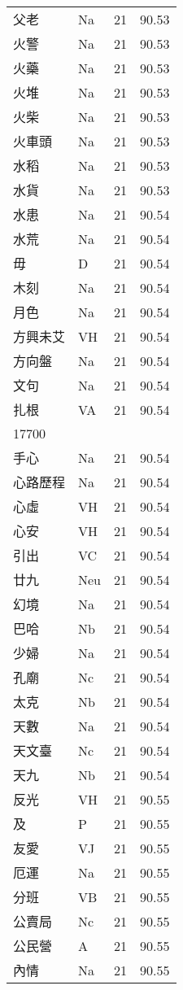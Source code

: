 \documentclass[twocolumn]{book}
\begin{document}
\begin{supertabular}{llrr}
父老 & Na & 21 &  90.53\\
火警 & Na & 21 &  90.53\\
火藥 & Na & 21 &  90.53\\
火堆 & Na & 21 &  90.53\\
火柴 & Na & 21 &  90.53\\
火車頭 & Na & 21 &  90.53\\
水稻 & Na & 21 &  90.53\\
水貨 & Na & 21 &  90.53\\
水患 & Na & 21 &  90.54\\
水荒 & Na & 21 &  90.54\\
毋 & D & 21 &  90.54\\
木刻 & Na & 21 &  90.54\\
月色 & Na & 21 &  90.54\\
方興未艾 & VH & 21 &  90.54\\
方向盤 & Na & 21 &  90.54\\
文句 & Na & 21 &  90.54\\
扎根 & VA & 21 &  90.54\\
17700\\
手心 & Na & 21 &  90.54\\
心路歷程 & Na & 21 &  90.54\\
心虛 & VH & 21 &  90.54\\
心安 & VH & 21 &  90.54\\
引出 & VC & 21 &  90.54\\
廿九 & Neu & 21 &  90.54\\
幻境 & Na & 21 &  90.54\\
巴哈 & Nb & 21 &  90.54\\
少婦 & Na & 21 &  90.54\\
孔廟 & Nc & 21 &  90.54\\
太克 & Nb & 21 &  90.54\\
天數 & Na & 21 &  90.54\\
天文臺 & Nc & 21 &  90.54\\
天九 & Nb & 21 &  90.54\\
反光 & VH & 21 &  90.55\\
及 & P & 21 &  90.55\\
友愛 & VJ & 21 &  90.55\\
厄運 & Na & 21 &  90.55\\
分班 & VB & 21 &  90.55\\
公賣局 & Nc & 21 &  90.55\\
公民營 & A & 21 &  90.55\\
內情 & Na & 21 &  90.55\\

\end{supertabular}
\end{document}
